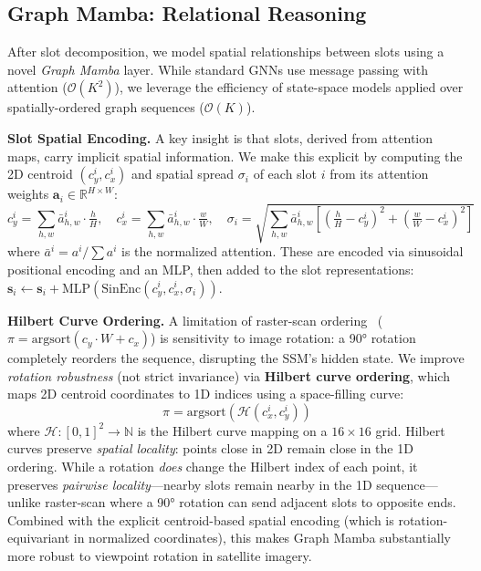 \documentclass{article}
\newcommand{\R}{\mathbb{R}}
\begin{document}
\subsection{Graph Mamba: Relational Reasoning}\label{sec:graphmamba}

After slot decomposition, we model spatial relationships between slots using a novel \textit{Graph Mamba} layer. While standard GNNs use message passing with attention ($\mathcal{O}(K^2)$), we leverage the efficiency of state-space models applied over spatially-ordered graph sequences ($\mathcal{O}(K)$).

\textbf{Slot Spatial Encoding.}
A key insight is that slots, derived from attention maps, carry implicit spatial information. We make this explicit by computing the 2D centroid $(c_y^i, c_x^i)$ and spatial spread $\sigma_i$ of each slot $i$ from its attention weights $\mathbf{a}_i \in \R^{H \times W}$:
\begin{equation}
    c_y^i = \sum_{h,w} \bar{a}^i_{h,w} \cdot \tfrac{h}{H}, \quad c_x^i = \sum_{h,w} \bar{a}^i_{h,w} \cdot \tfrac{w}{W}, \quad \sigma_i = \sqrt{\sum_{h,w} \bar{a}^i_{h,w} \left[(\tfrac{h}{H} - c_y^i)^2 + (\tfrac{w}{W} - c_x^i)^2\right]}
\end{equation}
where $\bar{a}^i = a^i / \sum a^i$ is the normalized attention. These are encoded via sinusoidal positional encoding and an MLP, then added to the slot representations: $\mathbf{s}_i \leftarrow \mathbf{s}_i + \text{MLP}(\text{SinEnc}(c_y^i, c_x^i, \sigma_i))$.

\textbf{Hilbert Curve Ordering.}
A limitation of raster-scan ordering~\cite{vim} ($\pi = \text{argsort}(c_y \cdot W + c_x)$) is sensitivity to image rotation: a 90° rotation completely reorders the sequence, disrupting the SSM's hidden state. We improve \textit{rotation robustness} (not strict invariance) via \textbf{Hilbert curve ordering}, which maps 2D centroid coordinates to 1D indices using a space-filling curve:
\begin{equation}
    \pi = \text{argsort}(\mathcal{H}(c_x^i, c_y^i))
\end{equation}
where $\mathcal{H}: [0,1]^2 \to \mathbb{N}$ is the Hilbert curve mapping on a $16{\times}16$ grid. Hilbert curves preserve \textit{spatial locality}: points close in 2D remain close in the 1D ordering. While a rotation \textit{does} change the Hilbert index of each point, it preserves \textit{pairwise locality}---nearby slots remain nearby in the 1D sequence---unlike raster-scan where a 90° rotation can send adjacent slots to opposite ends. Combined with the explicit centroid-based spatial encoding (which is rotation-equivariant in normalized coordinates), this makes Graph Mamba substantially more robust to viewpoint rotation in satellite imagery.
\end{document}
